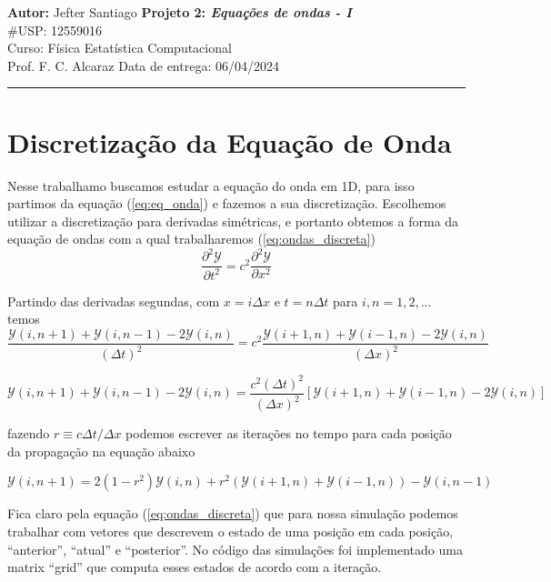 \documentclass[a4paper, 11pt]{article}
\begin{document}
\noindent
\large\textbf{Autor:} Jefter Santiago \hfill \textbf{Projeto 2: {\color{blue}\emph{Equações de ondas - I}}}   \\
\#USP: 12559016 \\
\normalsize Curso: Física Estatística Computacional \\
Prof. F. C. Alcaraz \hfill Data de entrega: 06/04/2024\\
\noindent\rule{7in}{2.8pt}


\section{Discretização da Equação de Onda}
Nesse trabalhamo buscamos estudar a equação do onda em 1D, para isso partimos da equação
(\ref{eq:eq_onda}) e fazemos a sua discretização. Escolhemos utilizar a discretização para derivadas
simétricas, e portanto obtemos a forma da equação de ondas com a qual trabalharemos (\ref{eq:ondas_discreta})
\begin{equation}
  \frac{\partial^2 \mathcal{Y}}{\partial t^2} = c^2  \frac{\partial^2 \mathcal{Y}}{\partial x^2}
  \label{eq:eq_onda}
\end{equation}

Partindo das derivadas segundas, com \( x = i \Delta x \) e \( t = n \Delta t \) para \( i, n = 1, 2, ... \)  temos
\[  \frac{\mathcal{Y}(i, n+1) + \mathcal{Y}(i,n-1) - 2 \mathcal{Y}(i,n)}{(\Delta t)^2} = c^2 \frac{\mathcal{Y}(i+1,n) + \mathcal{Y}(i-1,n) -
    2\mathcal{Y}(i,n)}{(\Delta x)^2} \]

\[ \mathcal{Y}(i, n+1) + \mathcal{Y}(i,n-1) - 2 \mathcal{Y}(i,n) = \frac{c^2 (\Delta t)^2}{(\Delta x)^2} \left[ \mathcal{Y}(i+1, n) + \mathcal{Y}(i-1,n) - 2\mathcal{Y}(i,n) \right]  \]

fazendo  \( r \equiv  c \Delta t/\Delta x\) podemos escrever as iterações no tempo para cada posição da propagação
na equação abaixo

\begin{equation}
  \mathcal{Y}(i, n+1) = 2 \left( 1 - r^2 \right) \mathcal{Y}(i, n) + r^2 \left( \mathcal{Y}(i+1,n) + \mathcal{Y}(i-1,n) \right) - \mathcal{Y}(i,n-1)
  \label{eq:ondas_discreta}
\end{equation}


Fica claro pela equação (\ref{eq:ondas_discreta}) que para nossa simulação podemos trabalhar com 
vetores que descrevem o estado de uma posição em cada posição, ``anterior'', ``atual'' e
``posterior''. No código das simulações foi implementado uma matrix ``grid'' que computa esses
estados de acordo com a iteração.  
\end{document}
